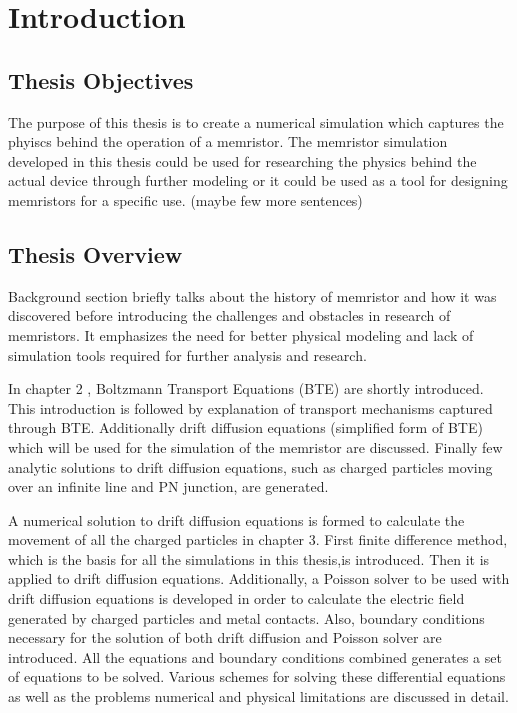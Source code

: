
\chapter{Introduction} %

\label{Chapter1} %


\section{Thesis Objectives}

The purpose of this thesis is to create a numerical simulation which captures the phyiscs behind the operation of a memristor. The memristor simulation developed in this thesis could be used for researching the physics behind the actual device through further modeling or it could be used as a tool for designing memristors for a specific use. (maybe few more sentences)

\section{Thesis Overview}

Background section briefly talks about the history of memristor and how it was discovered before introducing the challenges and obstacles in research of memristors. It emphasizes the need for better physical modeling and lack of simulation tools required for further analysis and research.

In chapter 2 , Boltzmann Transport Equations (BTE) are shortly introduced. This introduction is followed by explanation of transport mechanisms captured through BTE. Additionally drift diffusion equations (simplified form of BTE) which will be used for the simulation of the memristor are discussed. Finally few analytic solutions to drift diffusion equations, such as charged particles moving over an infinite line and PN junction, are generated. 

A numerical solution to drift diffusion equations is formed to calculate the movement of all the charged particles in chapter 3. First finite difference method, which is the basis for all the simulations in this thesis,is introduced. Then it is applied to drift diffusion equations. Additionally, a Poisson solver to be used with drift diffusion equations is developed in order to calculate the electric field generated by charged particles and metal contacts. Also, boundary conditions necessary for the solution of both drift diffusion and Poisson solver are introduced. All the equations and boundary conditions combined generates a set of equations to be solved. Various schemes for solving these differential equations as well as the problems numerical and physical limitations are discussed in detail.
 

